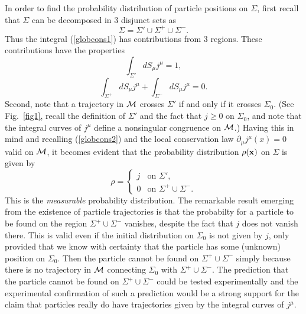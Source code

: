 \documentclass[12pt]{article}
\begin{document}
In order to find the probability distribution of particle positions 
on $\Sigma$, first recall that $\Sigma$ can be decomposed in 
3 disjunct sets as
\begin{equation}
\Sigma=\Sigma' \cup \Sigma^+ \cup \Sigma^- .
\end{equation}
Thus the integral (\ref{globcons1}) has contributions from 3 regions. 
These contributions have the properties
\begin{equation}\label{globcons2}
 \displaystyle\int_{\Sigma'} dS_{\mu}j^{\mu}=1, 
\end{equation}
\begin{equation}
 \displaystyle\int_{\Sigma^+} dS_{\mu}j^{\mu} + 
\displaystyle\int_{\Sigma^-} dS_{\mu}j^{\mu}=0. 
\end{equation}
Second, note that a trajectory in ${\cal M}$ crosses $\Sigma'$ if and only 
if it crosses $\Sigma_0$. (See Fig.~\ref{fig1}, recall the definition 
of $\Sigma'$ and the fact that  
$j\geq 0$ on $\Sigma_0$, and note that the integral 
curves of $j^{\mu}$ define a nonsingular congruence on ${\cal M}$.)  
Having this in mind and recalling (\ref{globcons2}) and the 
local conservation law $\partial_{\mu}j^{\mu}(x)=0$ valid on ${\cal M}$, 
it becomes evident
that the probability distribution $\rho({\bf x})$ on $\Sigma$ is given by
\begin{equation}\label{probdis}
\rho=\left\{
\begin{array}{ll}
j & \mbox{on $\Sigma'$}, \\
0 & \mbox{on $\Sigma^+\cup\Sigma^-$}.
\end{array}  
\right.
\end{equation}
%
This is the {\em measurable} probability distribution.
%
The remarkable result emerging from the existence of particle trajectories
is that the probabilty for a particle to be found on the region  
$\Sigma^+\cup\Sigma^-$ vanishes, despite the fact that $j$ does not 
vanish there. This is valid even if the initial distribution on 
$\Sigma_0$ is not given by $j$, only provided that we know 
with certainty that the particle has some 
(unknown) position on $\Sigma_0$. 
Then the particle cannot be found on $\Sigma^+\cup\Sigma^-$ simply because 
there is no trajectory in ${\cal M}$ connecting $\Sigma_0$ with 
$\Sigma^+\cup\Sigma^-$.  
The prediction that the particle cannot be found on $\Sigma^+\cup\Sigma^-$
could be tested experimentally and the experimental confirmation
of such a prediction would be a strong support 
for the claim that particles 
really do have trajectories given by the integral curves of $j^{\mu}$.
    
\end{document}
